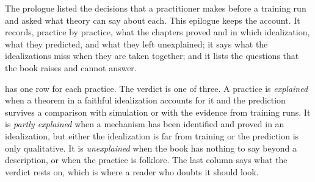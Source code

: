 \label{ch:epilogue}
\begin{refsection}[chapters/16-epilogue.bib]
\renewcommand{\thetable}{\arabic{table}}\setcounter{table}{2}

The prologue listed the decisions that a practitioner makes before a training run and asked what theory can say about each. This epilogue keeps the account. It records, practice by practice, what the chapters proved and in which idealization, what they predicted, and what they left unexplained; it says what the idealizations miss when they are taken together; and it lists the questions that the book raises and cannot answer.


 has one row for each practice. The verdict is one of three. A practice is \emph{explained} when a theorem in a faithful idealization accounts for it and the prediction survives a comparison with simulation or with the evidence from training runs. It is \emph{partly explained} when a mechanism has been identified and proved in an idealization, but either the idealization is far from training or the prediction is only qualitative. It is \emph{unexplained} when the book has nothing to say beyond a description, or when the practice is folklore. The last column says what the verdict rests on, which is where a reader who doubts it should look.


\end{refsection}
